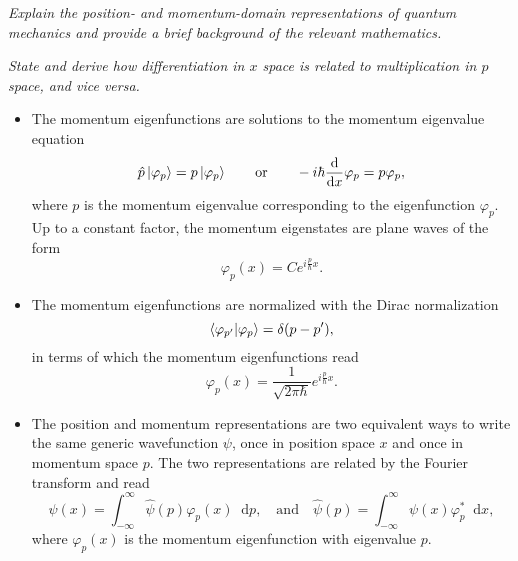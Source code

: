 \documentclass[11pt, a4paper]{article}
\newcommand{\diff}{\mathop{}\!\mathrm{d}} %
\newcommand{\F}[1]{\widehat{#1}} %
\begin{document}
\vspace{2mm}

\textit{Explain the position- and momentum-domain representations of quantum mechanics and provide a brief background of the relevant mathematics.}

\vspace{2mm}
\textit{State and derive how differentiation in $ x $ space is related to multiplication in $ p $ space, and vice versa.}

\begin{itemize}

    \item The momentum eigenfunctions are solutions to the momentum eigenvalue equation
    \begin{equation*}
        \hat{p} \ket{\varphi_{p}} = p \ket{\varphi_{p}} \qquad \text{or} \qquad -i \hbar \dv{x} \varphi_{p} = p \varphi_{p},
    \end{equation*}
    where $ p $ is the momentum eigenvalue corresponding to the eigenfunction $ \varphi_{p} $. Up to a constant factor, the momentum eigenstates are plane waves of the form
    \begin{equation*}
        \varphi_{p}(x) = C e^{i \frac{p}{\hbar}x}.
    \end{equation*}
    
    \item The momentum eigenfunctions are normalized with the Dirac normalization
    \begin{equation*}
       \braket{\varphi_{p'}}{\varphi_{p}} = \delta(p - p'),
    \end{equation*}
    in terms of which the momentum eigenfunctions read
    \begin{equation*}
        \varphi_{p}(x) = \frac{1}{\sqrt{2\pi \hbar}} e^{i \frac{p}{\hbar}x}.
    \end{equation*}

    \item The position and momentum representations are two equivalent ways to write the same generic wavefunction $ \psi $, once in position space $ x $ and once in momentum space $ p $. The two representations are related by the Fourier transform and read
    \begin{equation*}
        \psi(x) = \int_{-\infty}^{\infty}\F{\psi}(p)\varphi_{p}(x)\diff p, \quad \text{and} \quad \F{\psi}(p) = \int_{-\infty}^{\infty}\psi(x)\varphi_{p}^{*} \diff x,
    \end{equation*}
    where $ \varphi_{p}(x) $ is the momentum eigenfunction with eigenvalue $ p $.


\end{itemize}
\end{document}
